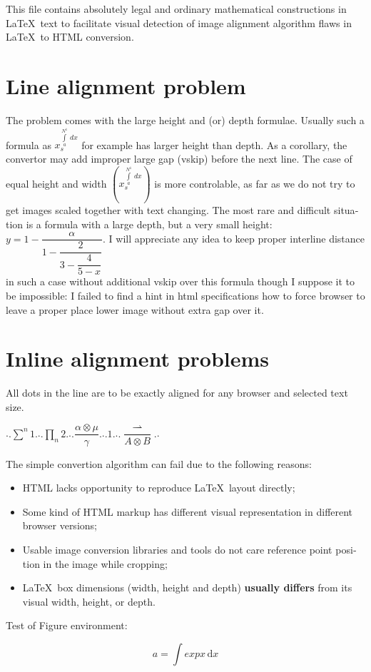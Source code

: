 \documentclass[12pt]{amsart}
\begin{document}
\begin{english}

This file contains absolutely legal and ordinary
mathematical constructions in \LaTeX\ text to facilitate visual
detection of image alignment algorithm flaws in \LaTeX\ to HTML conversion.

\section {Line alignment problem}
The problem comes with the large height and (or) depth formulae. 
Usually such a formula as $x_s^{\int\limits_a^{N^1}\, dx}$ for example has
larger height than depth. As a corollary, the convertor may add improper large gap (vskip) before the next
line. The case of equal height and width $\left(x_s^{\int\limits_a^{N^1}\, dx}\right)$ is more controlable, 
as far as we do not try to get images scaled together with text changing.
The most rare and difficult situation is a formula with a large depth, but a very small height: 
$y=1-\dfrac{\alpha}{1-\dfrac{2}{3-\dfrac{4}{5-x}}}$.
I will appreciate any idea to keep proper interline distance in such a case without 
additional vskip over this formula though I suppose it to be impossible: I failed to find a hint in html 
specifications how to force browser to leave a proper place lower image without extra gap over it. 

\section {Inline alignment problems}All dots in the line are to be exactly aligned for any browser and selected text size.

.$.\sum\limits^n1.$.$.\prod\limits_n2.$.$.\dfrac{\alpha\otimes\mu}{\gamma}.$.$.1.$.$.\dfrac {\rightharpoonup}{A\otimes B}.$.

The simple convertion algorithm can fail due to the following reasons:
\begin {itemize} 
\item HTML lacks opportunity to reproduce \LaTeX\ layout directly;
\item Some kind of HTML markup has different visual representation in different browser versions;  
\item Usable image conversion libraries and tools do not care reference point position in the image while cropping;
\item \LaTeX\ box dimensions (width, height and depth) \textbf{usually differs} from its visual width, height, or depth. 
\end {itemize}

Test of Figure environment:
\begin{figure}
\[ a = \int exp{x} \,\mathrm{d}x \]
\end{figure}

\end{english}
\end{document}
